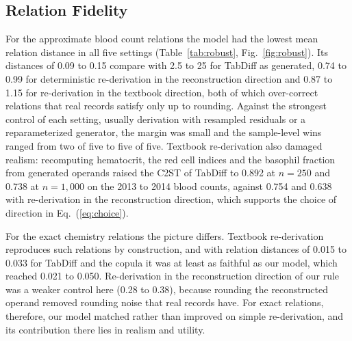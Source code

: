 \documentclass[conference]{IEEEtran}
\begin{document}
\subsection*{Relation Fidelity}

For the approximate blood count relations the model had the lowest mean relation distance in all five settings (Table~\ref{tab:robust}, Fig.~\ref{fig:robust}). Its distances of 0.09 to 0.15 compare with 2.5 to 25 for TabDiff as generated, 0.74 to 0.99 for deterministic re-derivation in the reconstruction direction and 0.87 to 1.15 for re-derivation in the textbook direction, both of which over-correct relations that real records satisfy only up to rounding. Against the strongest control of each setting, usually derivation with resampled residuals or a reparameterized generator, the margin was small and the sample-level wins ranged from two of five to five of five. Textbook re-derivation also damaged realism: recomputing hematocrit, the red cell indices and the basophil fraction from generated operands raised the C2ST of TabDiff to 0.892 at $n = 250$ and 0.738 at $n = 1{,}000$ on the 2013 to 2014 blood counts, against 0.754 and 0.638 with re-derivation in the reconstruction direction, which supports the choice of direction in Eq.~(\ref{eq:choice}).

For the exact chemistry relations the picture differs. Textbook re-derivation reproduces such relations by construction, and with relation distances of 0.015 to 0.033 for TabDiff and the copula it was at least as faithful as our model, which reached 0.021 to 0.050. Re-derivation in the reconstruction direction of our rule was a weaker control here (0.28 to 0.38), because rounding the reconstructed operand removed rounding noise that real records have. For exact relations, therefore, our model matched rather than improved on simple re-derivation, and its contribution there lies in realism and utility.
\end{document}
